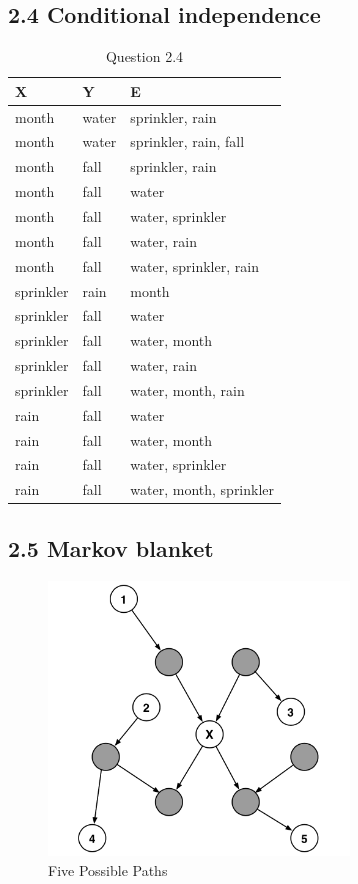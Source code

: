 \documentclass{article}
\begin{document}
\subsection*{2.4 Conditional independence}

\begin{table}[h!]
	\centering
	\begin{tabular}{|p{2cm}|p{2cm}|p{4cm}|}
		\hline
		X & Y & E \\
		\hline
		month & water & sprinkler, rain\\
		\hline
		month & water & sprinkler, rain, fall\\
		\hline
		month & fall & sprinkler, rain\\
		\hline
		month & fall & water\\
		\hline
		month & fall & water, sprinkler\\
		\hline
		month & fall & water, rain\\
		\hline
		month & fall & water, sprinkler, rain\\
		\hline
		sprinkler & rain & month \\
		\hline
		sprinkler & fall & water \\
		\hline
		sprinkler & fall & water, month \\
		\hline
		sprinkler & fall & water, rain\\
		\hline
		sprinkler & fall & water, month, rain \\
		\hline
		rain & fall & water \\
		\hline
		rain & fall & water, month \\
		\hline
		rain & fall & water, sprinkler\\
		\hline
		rain & fall & water, month, sprinkler \\
		\hline
	\end{tabular}
	\caption{Question 2.4}
\end{table}



\subsection*{2.5 Markov blanket}
\begin{figure}[h!]
	\centering
	\includegraphics[width=8cm]{q2.5.png}
	\caption{Five Possible Paths}
	\label{path}
\end{figure}
\end{document}
